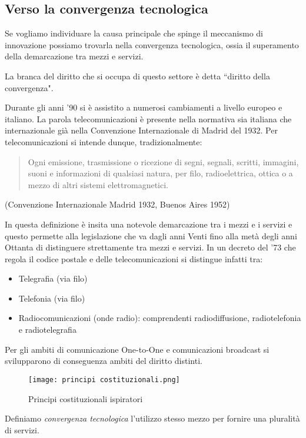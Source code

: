 \subsection{Verso la convergenza tecnologica}
Se vogliamo individuare la causa principale che spinge il meccanismo di innovazione possiamo trovarla nella convergenza tecnologica, ossia il superamento della demarcazione tra mezzi e servizi. 

La branca del diritto che si occupa di questo settore è detta ``diritto della convergenza". 

Durante gli anni '90 si è assistito a numerosi cambiamenti a livello europeo e italiano. La parola telecomunicazioni è presente nella normativa sia italiana che internazionale già nella Convenzione Internazionale di Madrid del 1932. Per telecomunicazioni si intende dunque, tradizionalmente:

\begin{quote}
    Ogni emissione, trasmissione o ricezione di segni, segnali, scritti, immagini, suoni e informazioni di qualsiasi natura, per filo, radioelettrica, ottica o a mezzo di altri sistemi elettromagnetici.    
\end{quote}
(Convenzione Internazionale Madrid 1932, Buenos Aires 1952)

In questa definizione è insita una notevole demarcazione tra i mezzi e i servizi e questo permette alla legislazione che va dagli anni Venti fino alla metà degli anni Ottanta di distinguere strettamente tra mezzi e servizi. 
In un decreto del '73 che regola il codice postale e delle telecomunicazioni si distingue infatti tra:
\begin{itemize}
    \item Telegrafia (via filo)
    \item Telefonia (via filo)
    \item Radiocomunicazioni (onde radio): comprendenti radiodiffusione, radiotelefonia e radiotelegrafia
\end{itemize}

Per gli ambiti di comunicazione One-to-One e comunicazioni broadcast si svilupparono di conseguenza ambiti del diritto distinti.

\begin{figure}
    \centering
    \texttt{[image: principi costituzionali.png]}
    \caption{Principi costituzionali ispiratori}
\end{figure}

Definiamo \textit{convergenza tecnologica} l'utilizzo stesso mezzo per fornire una pluralità di servizi.

